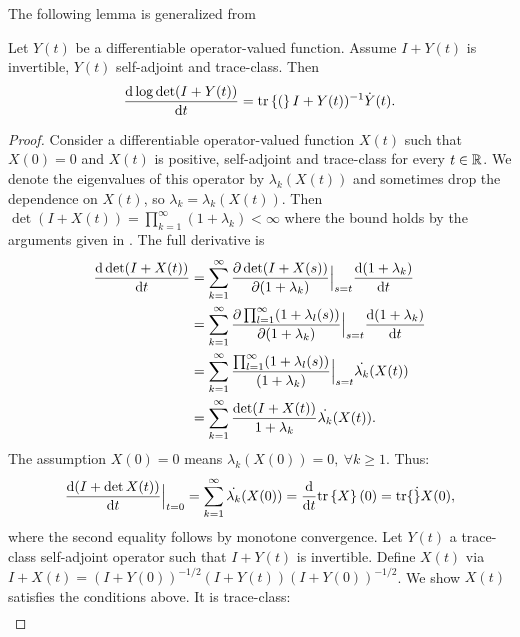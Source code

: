 \documentclass{amsart}
\numberwithin{equation}{section}
\begin{document}
The following lemma is generalized from \cite[Chapter 9,
  Theorem 4, pp. 127]{Lax97}
\begin{lemma}\label{lemma:lax}
  Let $Y(t)$ be a differentiable operator-valued function. Assume 
  $I+Y(t)$ is invertible, $Y(t)$ self-adjoint and trace-class. Then
  \begin{equation*}
    \frac{\text{\textup{d}} \log \det (I+Y(t))}{\text{\textup{d}} t} = \textup{tr}\left \{( \right \}I+Y(t))^{-1} \dot{Y}(t).
  \end{equation*}
\end{lemma}
\begin{proof}
  Consider a differentiable operator-valued function $X(t)$ such that
  $X(0) = 0$ and $X(t)$ is positive, self-adjoint and trace-class for
  every $t\in \mathbb{R}$. We denote the eigenvalues of this operator by
  $\lambda_k(X(t))$ and sometimes drop the dependence on $X(t)$, so
  $\lambda_k = \lambda_k(X(t))$.  Then $\det (I+X(t)) =
  \prod_{k=1}^{\infty} (1+\lambda_k) < \infty$ where the bound holds
  by the arguments given in \cite{AlexanderianGloorGhattas14}. The
  full derivative is
  \begin{align*}
    \frac{\text{\textup{d}} \det (I+X(t))}{\text{\textup{d}} t} 
    &= \sum_{k=1}^{\infty} 
    \frac{\partial \det (I+X(s))}{\partial (1+\lambda_k)}\Big |_{s=t}
    \frac{\text{\textup{d}} (1+\lambda_k)}{\text{\textup{d}} t} \\
    &= \sum_{k=1}^{\infty} \frac{\partial \prod_{l=1}^{\infty}
      (1+\lambda_l(s))}{\partial (1+\lambda_k)}\Big |_{s=t}
    \frac{\text{\textup{d}} (1+\lambda_k)}{\text{\textup{d}} t} \\
    &= \sum_{k=1}^{\infty} \frac{\prod_{l=1}^{\infty}
      (1+\lambda_l(s))}{(1+\lambda_k)}\Big |_{s=t}
    \dot{\lambda_k}(X(t)) \\
    &= \sum_{k=1}^{\infty} \frac{\det (I+X(t))}{1 +\lambda_k} \dot{\lambda_k}(X(t)).
  \end{align*}
  The assumption $X(0) = 0$ means $\lambda_k(X(0)) = 0,\ \forall k \geq 1$. Thus:
  \begin{align*}
    \frac{\text{\textup{d}} (I+\det X(t))}{\text{\textup{d}} t}\Big |_{t=0}
    = \sum_{k=1}^{\infty} \dot{\lambda_k}(X(0))
    = \frac{\text{\textup{d}} }{\text{\textup{d}} t}\textup{tr}\left \{X \right \}(0)
    = \textup{tr}\{\dot\}{X}(0),
  \end{align*}
  where the second equality follows by monotone convergence. 
  Let $Y(t)$ a trace-class self-adjoint operator such that 
  $I+Y(t)$ is invertible.
  Define $X(t)$ via $I+X(t) = (I+Y(0))^{-1/2} (I+Y(t)) (I+Y(0))^{-1/2}$. 
  We show $X(t)$ satisfies the conditions above. It is trace-class:
  \begin{align*}

\end{align*}
\end{proof}
\end{document}
